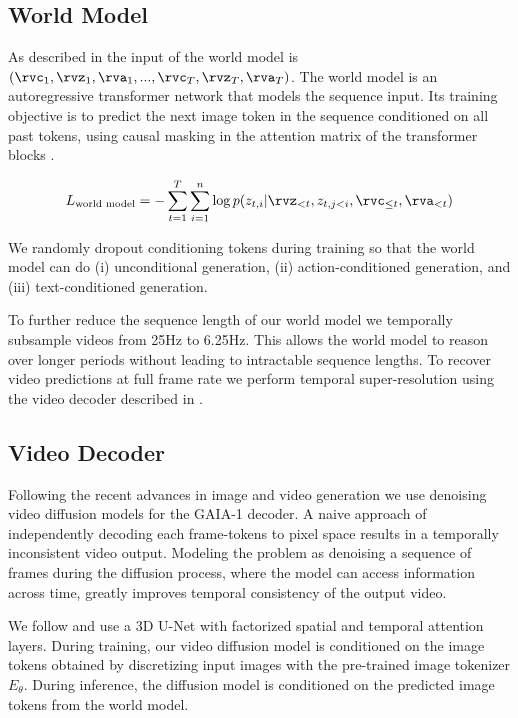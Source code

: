 \subsection{World Model}
\label{subsection:world-model}
As described in  the input of the world model is $(\rvc_1,\rvz_1, \rva_1, ..., \rvc_T, \rvz_T, \rva_T)$. The world model is an autoregressive transformer network that models the sequence input. Its training objective is to predict the next image token in the sequence conditioned on all past tokens, using causal masking in the attention matrix of the transformer blocks \citep{vaswani17}.

\begin{equation}
L_{\text{world model}} = -\sum_{t=1}^T \sum_{i=1}^n\log p(z_{t,i} | \rvz_{<t}, z_{t, j < i}, \rvc_{\leq t}, \rva_{<t})
\end{equation}

We randomly dropout conditioning tokens during training so that the world model can do (i) unconditional generation, (ii) action-conditioned generation, and (iii) text-conditioned generation.

To further reduce the sequence length of our world model we temporally subsample videos from 25Hz to 6.25Hz. This allows the world model to reason over longer periods without leading to intractable sequence lengths. To recover video predictions at full frame rate we perform temporal super-resolution using the video decoder described in .


\subsection{Video Decoder}
\label{subsection:video-decoder}
Following the recent advances in image \citep{rombach2022highresolution, saharia2022photorealistic} and video generation \citep{ho2022imagen, esser2023structure} we use denoising video diffusion models for the GAIA-1 decoder. A naive approach of independently decoding each frame-tokens to pixel space results in a temporally inconsistent video output. Modeling the problem as denoising a sequence of frames during the diffusion process, where the model can access information across time, greatly improves temporal consistency of the output video. 

We follow \citep{ho2022video} and use a 3D U-Net with factorized spatial and temporal attention layers. During training, our video diffusion model is conditioned on the image tokens obtained by discretizing input images with the pre-trained image tokenizer $E_{\theta}$. During inference, the diffusion model is conditioned on the predicted image tokens from the world model.

